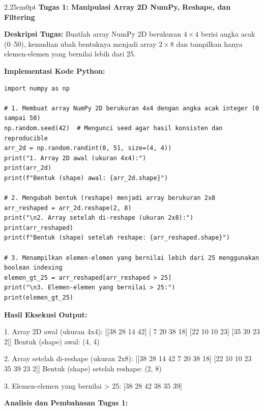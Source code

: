 \documentclass[12pt,a4paper]{article}
\begin{document}
\begin{adjustwidth}{2.25cm}{0pt}
\hspace*{-0.75cm}\textbf{\normalsize Tugas 1: Manipulasi Array 2D NumPy, Reshape, dan Filtering}\par
\vspace{0.12cm}

\textbf{Deskripsi Tugas:}  
Buatlah array NumPy 2D berukuran $4\times4$ berisi angka acak (0--50), kemudian ubah bentuknya menjadi array $2\times8$ dan tampilkan hanya elemen-elemen yang bernilai lebih dari 25.

\vspace{0.12cm}
\textbf{Implementasi Kode Python:}
\begin{lstlisting}
import numpy as np

# 1. Membuat array NumPy 2D berukuran 4x4 dengan angka acak integer (0 sampai 50)
np.random.seed(42)  # Mengunci seed agar hasil konsisten dan reproducible
arr_2d = np.random.randint(0, 51, size=(4, 4))
print("1. Array 2D awal (ukuran 4x4):")
print(arr_2d)
print(f"Bentuk (shape) awal: {arr_2d.shape}")

# 2. Mengubah bentuk (reshape) menjadi array berukuran 2x8
arr_reshaped = arr_2d.reshape(2, 8)
print("\n2. Array setelah di-reshape (ukuran 2x8):")
print(arr_reshaped)
print(f"Bentuk (shape) setelah reshape: {arr_reshaped.shape}")

# 3. Menampilkan elemen-elemen yang bernilai lebih dari 25 menggunakan boolean indexing
elemen_gt_25 = arr_reshaped[arr_reshaped > 25]
print("\n3. Elemen-elemen yang bernilai > 25:")
print(elemen_gt_25)
\end{lstlisting}

\textbf{Hasil Eksekusi Output:}
\begin{outputbox}
1. Array 2D awal (ukuran 4x4):
[[38 28 14 42]
 [ 7 20 38 18]
 [22 10 10 23]
 [35 39 23  2]]
Bentuk (shape) awal: (4, 4)

2. Array setelah di-reshape (ukuran 2x8):
[[38 28 14 42  7 20 38 18]
 [22 10 10 23 35 39 23  2]]
Bentuk (shape) setelah reshape: (2, 8)

3. Elemen-elemen yang bernilai > 25:
[38 28 42 38 35 39]
\end{outputbox}

\textbf{Analisis dan Pembahasan Tugas 1:}
\end{adjustwidth}
\end{document}
